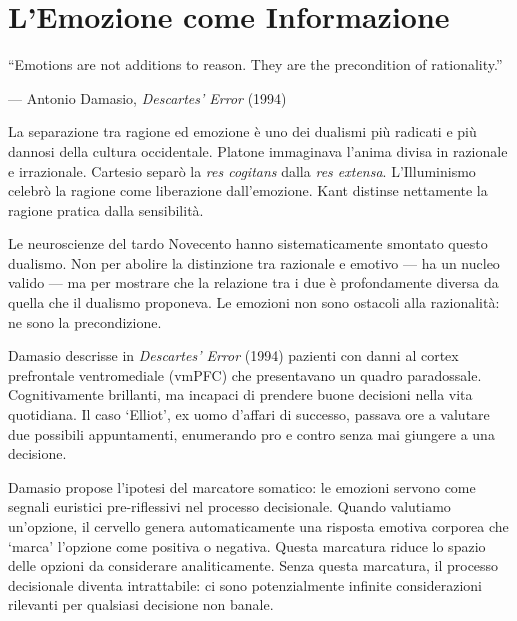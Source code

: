 \documentclass[12pt,a4paper,openany]{book}
\newcommand{\sezione}[1]{\vspace{1.2em}{\large\bfseries #1}\vspace{0.5em}\par}
\begin{document}
\chapter{L'Emozione come Informazione}

\epigraph{``Emotions are not additions to reason. They are the precondition of rationality.''}{--- Antonio Damasio, \textit{Descartes' Error} (1994)}

\sezione{Il dualismo da demolire}

La separazione tra ragione ed emozione è uno dei dualismi più radicati e più dannosi della cultura occidentale. Platone immaginava l'anima divisa in razionale e irrazionale. Cartesio separò la \textit{res cogitans} dalla \textit{res extensa}. L'Illuminismo celebrò la ragione come liberazione dall'emozione. Kant distinse nettamente la ragione pratica dalla sensibilità.

Le neuroscienze del tardo Novecento hanno sistematicamente smontato questo dualismo. Non per abolire la distinzione tra razionale e emotivo — ha un nucleo valido — ma per mostrare che la relazione tra i due è profondamente diversa da quella che il dualismo proponeva. Le emozioni non sono ostacoli alla razionalità: ne sono la precondizione.

\sezione{Antonio Damasio e l'ipotesi del marcatore somatico}

Damasio descrisse in \textit{Descartes' Error} (1994) pazienti con danni al cortex prefrontale ventromediale (vmPFC) che presentavano un quadro paradossale. Cognitivamente brillanti, ma incapaci di prendere buone decisioni nella vita quotidiana. Il caso `Elliot', ex uomo d'affari di successo, passava ore a valutare due possibili appuntamenti, enumerando pro e contro senza mai giungere a una decisione.

Damasio propose l'ipotesi del marcatore somatico: le emozioni servono come segnali euristici pre-riflessivi nel processo decisionale. Quando valutiamo un'opzione, il cervello genera automaticamente una risposta emotiva corporea che `marca' l'opzione come positiva o negativa. Questa marcatura riduce lo spazio delle opzioni da considerare analiticamente. Senza questa marcatura, il processo decisionale diventa intrattabile: ci sono potenzialmente infinite considerazioni rilevanti per qualsiasi decisione non banale.

\sezione{Lisa Feldman Barrett: le emozioni come costruzioni culturali}
\end{document}
